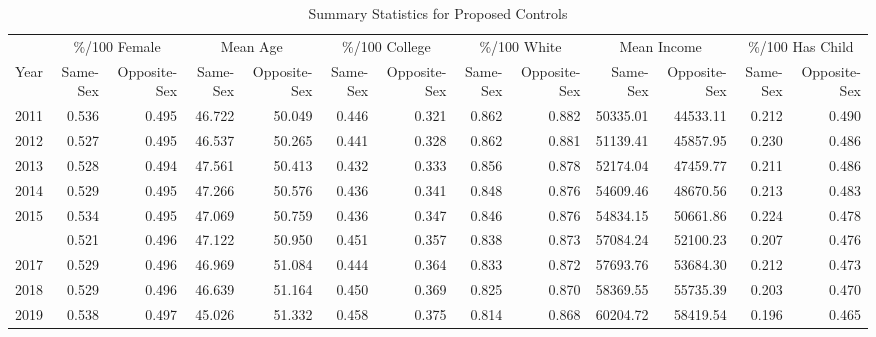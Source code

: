 \begin{table}

\caption{Summary Statistics for Proposed Controls}
\centering
\begin{tabular}[t]{rrrrrrrrrrrrr}
\toprule
\multicolumn{1}{c}{ } & \multicolumn{2}{c}{\%/100 Female} & \multicolumn{2}{c}{Mean Age} & \multicolumn{2}{c}{\%/100 College} & \multicolumn{2}{c}{\%/100 White} & \multicolumn{2}{c}{Mean Income} & \multicolumn{2}{c}{\%/100 Has Child} \\
\cmidrule(l{3pt}r{3pt}){2-3} \cmidrule(l{3pt}r{3pt}){4-5} \cmidrule(l{3pt}r{3pt}){6-7} \cmidrule(l{3pt}r{3pt}){8-9} \cmidrule(l{3pt}r{3pt}){10-11} \cmidrule(l{3pt}r{3pt}){12-13}
Year & Same-Sex & Opposite-Sex & Same-Sex & Opposite-Sex & Same-Sex & Opposite-Sex & Same-Sex & Opposite-Sex & Same-Sex & Opposite-Sex & Same-Sex & Opposite-Sex\\
\midrule
2011 & 0.536 & 0.495 & 46.722 & 50.049 & 0.446 & 0.321 & 0.862 & 0.882 & 50335.01 & 44533.11 & 0.212 & 0.490\\
2012 & 0.527 & 0.495 & 46.537 & 50.265 & 0.441 & 0.328 & 0.862 & 0.881 & 51139.41 & 45857.95 & 0.230 & 0.486\\
2013 & 0.528 & 0.494 & 47.561 & 50.413 & 0.432 & 0.333 & 0.856 & 0.878 & 52174.04 & 47459.77 & 0.211 & 0.486\\
2014 & 0.529 & 0.495 & 47.266 & 50.576 & 0.436 & 0.341 & 0.848 & 0.876 & 54609.46 & 48670.56 & 0.213 & 0.483\\
2015 & 0.534 & 0.495 & 47.069 & 50.759 & 0.436 & 0.347 & 0.846 & 0.876 & 54834.15 & 50661.86 & 0.224 & 0.478\\
\addlinespace
2016 & 0.521 & 0.496 & 47.122 & 50.950 & 0.451 & 0.357 & 0.838 & 0.873 & 57084.24 & 52100.23 & 0.207 & 0.476\\
2017 & 0.529 & 0.496 & 46.969 & 51.084 & 0.444 & 0.364 & 0.833 & 0.872 & 57693.76 & 53684.30 & 0.212 & 0.473\\
2018 & 0.529 & 0.496 & 46.639 & 51.164 & 0.450 & 0.369 & 0.825 & 0.870 & 58369.55 & 55735.39 & 0.203 & 0.470\\
2019 & 0.538 & 0.497 & 45.026 & 51.332 & 0.458 & 0.375 & 0.814 & 0.868 & 60204.72 & 58419.54 & 0.196 & 0.465\\
\bottomrule
\end{tabular}
\end{table}
